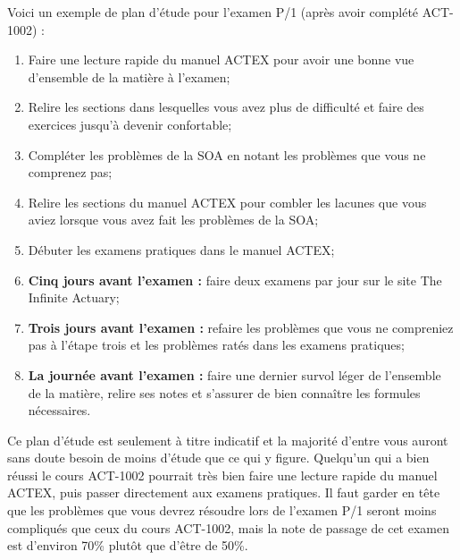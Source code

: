 Voici un exemple de plan d'étude pour l'examen P/1 (après avoir complété ACT-1002) :
\begin{enumerate}
\item Faire une lecture rapide du manuel ACTEX pour avoir une bonne vue d'ensemble de la matière à l'examen;
\item Relire les sections dans lesquelles vous avez plus de difficulté et faire des exercices jusqu'à devenir confortable;
\item Compléter les problèmes de la SOA en notant les problèmes que vous ne comprenez pas;
\item Relire les sections du manuel ACTEX pour combler les lacunes que vous aviez lorsque vous avez fait les problèmes de la SOA;
\item Débuter les examens pratiques dans le manuel ACTEX;
\item \textbf{Cinq jours avant l'examen :} faire deux examens par jour sur le site The Infinite Actuary;
\item \textbf{Trois jours avant l'examen :} refaire les problèmes que vous ne compreniez pas à l'étape trois et les problèmes ratés dans les examens pratiques;
\item \textbf{La journée avant l'examen :} faire une dernier survol léger de l'ensemble de la matière, relire ses notes et s'assurer de bien connaître les formules nécessaires.
\end{enumerate}
\vspace{\baselineskip}

Ce plan d'étude est seulement à titre indicatif et la majorité d'entre vous auront sans doute besoin de moins d'étude que ce qui y figure. Quelqu'un qui a bien réussi le cours ACT-1002 pourrait très bien faire une lecture rapide du manuel ACTEX, puis passer directement aux examens pratiques. Il faut garder en tête que les problèmes que vous devrez résoudre lors de l'examen P/1 seront moins compliqués que ceux du cours ACT-1002, mais la note de passage de cet examen est d'environ 70\% plutôt que d'être de 50\%. 

\newpage
